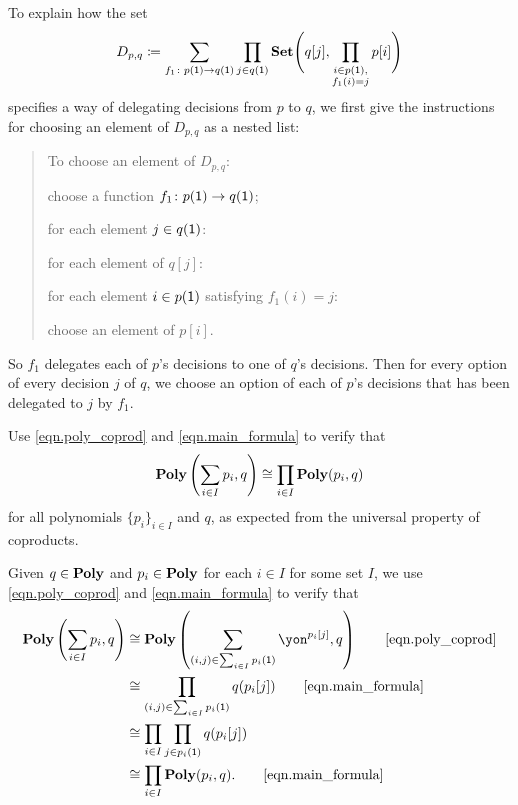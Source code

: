 \documentclass[Book-Poly]{subfiles}
\begin{document}
\begin{exercise}
\begin{solution}
\begin{longenum}
\item To explain how the set
\[
	D_{p,q} \coloneqq \sum_{f_1\colon p(\textsf{1})\to q(\textsf{1})}\prod_{j\in q(\textsf{1})}\mathbf{Set}\Bigg(q[j],\prod_{\substack{i \in p(\textsf{1}), \\ f_1(i) = j}}p[i]\Bigg)
\]
specifies a way of delegating decisions from $p$ to $q$, we first give the instructions for choosing an element of $D_{p,q}$ as a nested list:
\begin{quote}
To choose an element of $D_{p,q}$:
\begin{longenum}
    \item choose a function $f_1 \colon p(\textsf{1}) \to q(\textsf{1})$;
    \item for each element $j \in q(\textsf{1})$:
    \begin{longenum}
        \item for each element of $q[j]$:
        \begin{longenum}
            \item for each element $i \in p(\textsf{1})$ satisfying $f_1(i) = j$:
            \begin{longenum}
                \item choose an element of $p[i]$.
            \end{longenum}
        \end{longenum}
    \end{longenum}
\end{longenum}
\end{quote}
So $f_1$ delegates each of $p$'s decisions to one of $q$'s decisions.
Then for every option of every decision $j$ of $q$, we choose an option of each of $p$'s decisions that has been delegated to $j$ by $f_1$.
\end{longenum}
\end{solution}
\end{exercise}

\begin{exercise}%
Use \eqref{eqn.poly_coprod} and \eqref{eqn.main_formula} to verify that
\[
    \mathbf{Poly}\left(\sum_{i \in I} p_i, q\right) \cong \prod_{i \in I} \mathbf{Poly}(p_i, q)
\]
for all polynomials $\{p_i\}_{i \in I}$ and $q$, as expected from the universal property of coproducts.
\begin{solution}
Given $q \in \mathbf{Poly}$ and $p_i \in \mathbf{Poly}$ for each $i \in I$ for some set $I$, we use \eqref{eqn.poly_coprod} and \eqref{eqn.main_formula} to verify that
\begin{align*}
    \poly\left(\sum_{i \in I} p_i, q\right)
    &\iso \poly\left(\sum_{(i,j) \in \sum_{i \in I} p_i(\1)} \yon^{p_i[j]}, q\right)
    \tag*{\eqref{eqn.poly_coprod}} \\
    &\iso \prod_{(i,j) \in \sum_{i \in I} p_i(\1)} q(p_i[j])
    \tag*{\eqref{eqn.main_formula}} \\
    &\iso \prod_{i \in I} \prod_{j \in p_i(\1)} q(p_i[j]) \\
    &\iso \prod_{i \in I} \poly(p_i, q).
    \tag*{\eqref{eqn.main_formula}}
\end{align*}
\end{solution}
\end{exercise}
\end{document}
